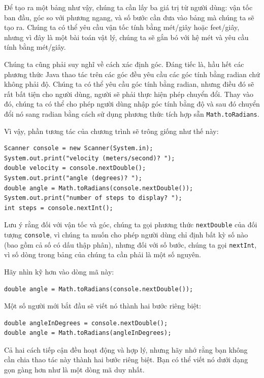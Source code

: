 Để tạo ra một bảng như vậy, chúng ta cần lấy ba giá trị từ người dùng:
vận tốc ban đầu, góc so với phương ngang, và số bước cần đưa vào bảng mà
chúng ta sẽ tạo ra. Chúng ta có thể yêu cầu vận tốc tính bằng mét/giây
hoặc feet/giây, nhưng vì đây là một bài toán vật lý, chúng ta sẽ gắn bó
với hệ mét và yêu cầu tính bằng mét/giây.

Chúng ta cũng phải suy nghĩ về cách xác định góc. Đáng tiếc là, hầu hết
các phương thức Java thao tác trên các góc đều yêu cầu các góc tính bằng
radian chứ không phải độ. Chúng ta có thể yêu cầu góc tính bằng radian,
nhưng điều đó sẽ rất bất tiện cho người dùng, người sẽ phải thực hiện
phép chuyển đổi. Thay vào đó, chúng ta có thể cho phép người dùng nhập
góc tính bằng độ và sau đó chuyển đổi nó sang radian bằng cách sử dụng
phương thức tích hợp sẵn \texttt{Math.toRadians}.

Vì vậy, phần tương tác của chương trình sẽ trông giống như thế này:

\begin{verbatim}
Scanner console = new Scanner(System.in);
System.out.print("velocity (meters/second)? ");
double velocity = console.nextDouble();
System.out.print("angle (degrees)? ");
double angle = Math.toRadians(console.nextDouble());
System.out.print("number of steps to display? ");
int steps = console.nextInt();
\end{verbatim}

Lưu ý rằng đối với vận tốc và góc, chúng ta gọi phương thức
\texttt{nextDouble} của đối tượng \texttt{console}, vì chúng ta muốn cho
phép người dùng chỉ định bất kỳ số nào (bao gồm cả số có dấu thập phân),
nhưng đối với số bước, chúng ta gọi \texttt{nextInt}, vì số dòng trong
bảng của chúng ta cần phải là một số nguyên.

Hãy nhìn kỹ hơn vào dòng mã này:

\begin{verbatim}
double angle = Math.toRadians(console.nextDouble());
\end{verbatim}

Một số người mới bắt đầu sẽ viết nó thành hai bước riêng biệt:

\begin{verbatim}
double angleInDegrees = console.nextDouble();
double angle = Math.toRadians(angleInDegrees);
\end{verbatim}

Cả hai cách tiếp cận đều hoạt động và hợp lý, nhưng hãy nhớ rằng bạn
không cần chia thao tác này thành hai bước riêng biệt. Bạn có thể viết
nó dưới dạng gọn gàng hơn như là một dòng mã duy nhất.

